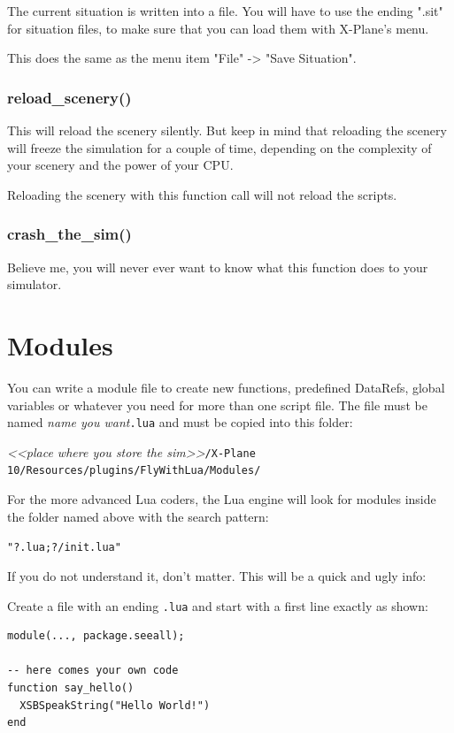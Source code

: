 \documentclass[11pt,parskip=half,a4paper]{scrartcl}
\begin{document}
The current situation is written into a file. You will have to use the ending ".sit" for situation files, to make sure that you can load them with X-Plane's menu.

This does the same as the menu item "File" -> "Save Situation".

\subsubsection{reload\_scenery()}

This will reload the scenery silently. But keep in mind that reloading the scenery will freeze the simulation for a couple of time, depending on the complexity of your scenery and the power of your CPU.

Reloading the scenery with this function call will not reload the scripts.


\subsubsection{crash\_the\_sim()}

Believe me, you will never ever want to know what this function does to your simulator.

\newpage
\section{Modules}

You can write a module file to create new functions, predefined DataRefs, global variables or whatever you need for more than one script file. The file must be named \emph{name you want}\verb|.lua| and must be copied into this folder:

\emph{<<place where you store the sim>>}\verb|/X-Plane 10/Resources/plugins/FlyWithLua/Modules/|

For the more advanced Lua coders, the Lua engine will look for modules inside the folder named above with the search pattern:

\verb|"?.lua;?/init.lua"|

If you do not understand it, don't matter. This will be a quick and ugly info:

Create a file with an ending \verb|.lua| and start with a first line exactly as shown:

\begin{lstlisting}
module(..., package.seeall);

-- here comes your own code
function say_hello()
  XSBSpeakString("Hello World!")
end
\end{lstlisting}
\end{document}
